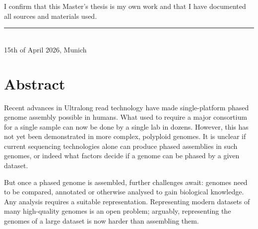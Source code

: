 \documentclass[12pt, twoside, a4paper]{report}
\begin{document}
\begin{titlepage}
\centering
\hspace{0pt}
\vfill
\begin{minipage}{.6\textwidth}
\centering
I confirm that this Master's thesis is my own work and that I have documented all sources and materials used.
\\[2cm]
\rule{7cm}{1pt}\\
15th of April 2026, Munich
\end{minipage}
\vfill
\hspace{0pt}
\end{titlepage}


\chapter*{Abstract}




Recent advances in Ultralong read technology have made single-platform phased genome assembly possible in humans.
What used to require a major consortium for a single sample can now be done by a single lab in dozens.
However, this has not yet been demonstrated in more complex, polyploid genomes.
It is unclear if current sequencing technologies alone can produce phased assemblies in such genomes, or indeed what factors decide if a genome can be phased by a given dataset. %

But once a phased genome is assembled, further challenges await: genomes need to be compared, annotated or otherwise analysed to gain biological knowledge.
Any analysis requires a suitable representation.
Representing modern datasets of many high-quality genomes is an open problem; arguably, representing the genomes of a large dataset is now harder than assembling them.
\end{document}
